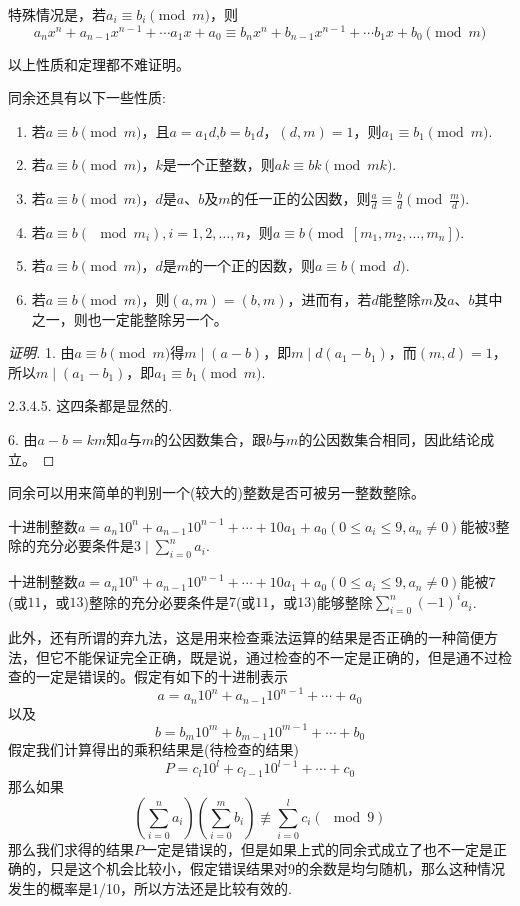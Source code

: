特殊情况是，若$a_i \equiv b_i \pmod{m}$，则
\[ a_nx^n+a_{n-1}x^{n-1}+\cdots a_1x+a_0 \equiv b_nx^n+b_{n-1}x^{n-1}+\cdots b_1x+b_0 \pmod{m} \]

以上性质和定理都不难证明。

\begin{theorem}
  同余还具有以下一些性质:
  \begin{enumerate}
  \item 若$a \equiv b \pmod{m}$，且$a=a_1d$,$b=b_1d$，$(d,m)=1$，则$a_1 \equiv b_1 \pmod{m}$.
  \item 若$a \equiv b \pmod{m}$，$k$是一个正整数，则$ak \equiv bk \pmod{mk}$.
  \item 若$a \equiv b \pmod{m}$，$d$是$a$、$b$及$m$的任一正的公因数，则$\frac{a}{d} \equiv \frac{b}{d} \pmod{\frac{m}{d}}$. 
  \item 若$a \equiv b (\mod m_i),i=1,2,\ldots,n$，则$a \equiv b \pmod{[m_1,m_2,\ldots,m_n]}$.
  \item 若$a \equiv b \pmod{m}$，$d$是$m$的一个正的因数，则$a \equiv b \pmod{d}$.
  \item 若$a \equiv b \pmod{m}$，则$(a,m)=(b,m)$，进而有，若$d$能整除$m$及$a$、$b$其中之一，则也一定能整除另一个。
  \end{enumerate}
\end{theorem}

\begin{proof}[证明]
  1. 由$a \equiv b \pmod{m}$得$m \mid (a-b)$，即$m \mid d(a_1-b_1)$，而$(m,d)=1$，所以$m \mid (a_1-b_1)$，即$a_1 \equiv b_1 \pmod{m}$.

  2.3.4.5. 这四条都是显然的.

  6. 由$a-b=km$知$a$与$m$的公因数集合，跟$b$与$m$的公因数集合相同，因此结论成立。
\end{proof}

同余可以用来简单的判别一个(较大的)整数是否可被另一整数整除。
\begin{theorem}
  十进制整数$a=a_n10^n+a_{n-1}10^{n-1}+\cdots+10a_1+a_0(0 \leqslant a_i \leqslant 9, a_n \neq 0)$能被$3$整除的充分必要条件是$3 \mid \sum_{i=0}^na_i$.
\end{theorem}

\begin{theorem}
  十进制整数$a=a_n10^n+a_{n-1}10^{n-1}+\cdots+10a_1+a_0(0 \leqslant a_i \leqslant 9, a_n \neq 0)$能被$7$(或$11$，或$13$)整除的充分必要条件是$7$(或$11$，或$13$)能够整除$\sum_{i=0}^n(-1)^ia_i$.
\end{theorem}

此外，还有所谓的弃九法，这是用来检查乘法运算的结果是否正确的一种简便方法，但它不能保证完全正确，既是说，通过检查的不一定是正确的，但是通不过检查的一定是错误的。假定有如下的十进制表示
\[ a = a_n10^n+a_{n-1}10^{n-1}+\cdots+a_0 \]
以及
\[ b = b_m10^m+b_{m-1}10^{m-1}+\cdots+b_0 \]
假定我们计算得出的乘积结果是(待检查的结果)
\[ P = c_l10^l+c_{l-1}10^{l-1}+\cdots+c_0 \]
那么如果
\[ \left( \sum_{i=0}^n a_i \right) \left( \sum_{i=0}^m b_i \right) \not \equiv \sum_{i=0}^l c_i (\mod 9) \]
那么我们求得的结果$P$一定是错误的，但是如果上式的同余式成立了也不一定是正确的，只是这个机会比较小，假定错误结果对9的余数是均匀随机，那么这种情况发生的概率是1/10，所以方法还是比较有效的.



